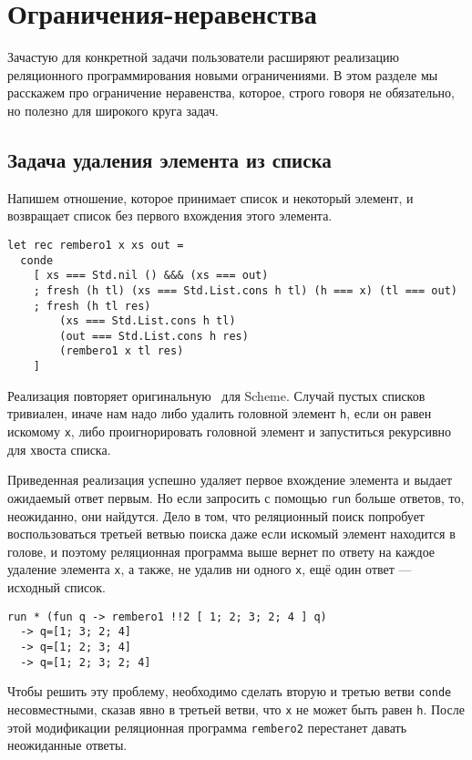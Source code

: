 
\section{Ограничения-неравенства}
\label{sec:diseq}

Зачастую для конкретной задачи пользователи расширяют реализацию реляционного программирования новыми ограничениями.
В этом разделе мы расскажем про ограничение неравенства, которое, строго говоря не обязательно, но полезно для широкого круга задач.

\subsection{Задача удаления элемента из списка}

Напишем отношение, которое принимает список и некоторый элемент, и возвращает список без первого вхождения этого элемента.

\begin{lstlisting}
let rec rembero1 x xs out =
  conde
    [ xs === Std.nil () &&& (xs === out)
    ; fresh (h tl) (xs === Std.List.cons h tl) (h === x) (tl === out)
    ; fresh (h tl res)
        (xs === Std.List.cons h tl)
        (out === Std.List.cons h res)
        (rembero1 x tl res)
    ]
\end{lstlisting}

\noindent Реализация повторяет оригинальную~\cite{WillThesis} для Scheme. Случай пустых списков тривиален, иначе нам надо либо удалить головной элемент \verb=h=, если он равен искомому \verb=x=, либо проигнорировать головной элемент и запуститься рекурсивно для хвоста списка.

Приведенная реализация успешно удаляет первое вхождение элемента и выдает ожидаемый ответ первым.
Но если запросить с помощью \verb=run= больше ответов, то, неожиданно, они найдутся.
Дело в том, что реляционный поиск попробует воспользоваться третьей ветвью поиска даже если искомый элемент находится в голове, и поэтому реляционная программа выше вернет по ответу на каждое удаление элемента \verb=x=, а также, не удалив ни одного \verb=x=, ещё один ответ --- исходный список.

\begin{lstlisting}
run * (fun q -> rembero1 !!2 [ 1; 2; 3; 2; 4 ] q)
  -> q=[1; 3; 2; 4]
  -> q=[1; 2; 3; 4]
  -> q=[1; 2; 3; 2; 4]
\end{lstlisting}
Чтобы решить эту проблему, необходимо сделать вторую и третью ветви \verb=conde= несовместными, сказав явно в третьей ветви, что \verb=x= не может быть равен \verb=h=.
После этой модификации реляционная программа \verb=rembero2= перестанет давать неожиданные ответы.



